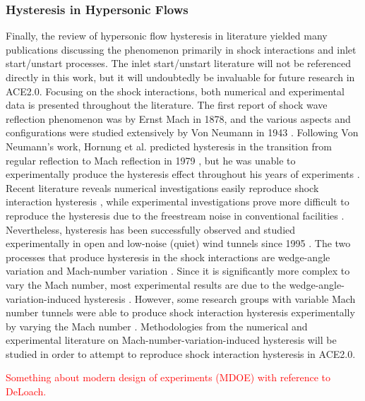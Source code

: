 \subsubsection{Hysteresis in Hypersonic Flows}
Finally, the review of hypersonic flow hysteresis in literature yielded many publications discussing the phenomenon primarily in shock interactions and inlet start/unstart processes. The inlet start/unstart literature will not be referenced directly in this work, but it will undoubtedly be invaluable for future research in ACE2.0. Focusing on the shock interactions, both numerical and experimental data is presented throughout the literature. The first report of shock wave reflection phenomenon was by Ernst Mach in 1878, and the various aspects and configurations were studied extensively by Von Neumann in 1943 \cite{von-neumann}. Following Von Neumann's work, Hornung et al. predicted hysteresis in the transition from regular reflection to Mach reflection in 1979 \cite{hornung-1}, but he was unable to experimentally produce the hysteresis effect throughout his years of experiments \cite{hornung-2}. Recent literature reveals numerical investigations easily reproduce shock interaction hysteresis \cite{chpoun-1,ivanov-3}, while experimental investigations prove more difficult to reproduce the hysteresis due to the freestream noise in conventional facilities \cite{ben-dor-1,laguarda}. Nevertheless, hysteresis has been successfully observed and studied experimentally in open and low-noise (quiet) wind tunnels since 1995 \cite{chpoun-2}. The two processes that produce hysteresis in the shock interactions are wedge-angle variation and Mach-number variation \cite{ben-dor-2}. Since it is significantly more complex to vary the Mach number, most experimental results are due to the wedge-angle-variation-induced hysteresis \cite{li,ivanov-4,mouton,setoguchi,chanetz}. However, some research groups with variable Mach number tunnels were able to produce shock interaction hysteresis experimentally by varying the Mach number \cite{durand,tao}. Methodologies from the numerical and experimental literature on Mach-number-variation-induced hysteresis will be studied in order to attempt to reproduce shock interaction hysteresis in ACE2.0.

\textcolor{red}{Something about modern design of experiments (MDOE) with reference to DeLoach.}
